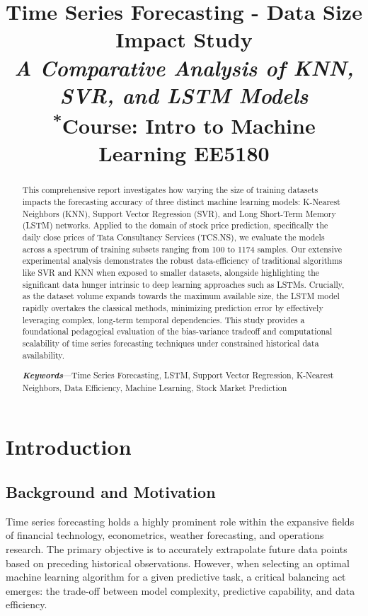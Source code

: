 \documentclass[12pt,onecolumn]{IEEEtran}
\begin{document}
\title{Time Series Forecasting - Data Size Impact Study\\
{\Large \textit{A Comparative Analysis of KNN, SVR, and LSTM Models}}\\
\vspace{1em}
{\normalsize \textsuperscript{*}Course: Intro to Machine Learning EE5180}
}

\author{
}

\maketitle

\vspace{2em}
\begin{abstract}
This comprehensive report investigates how varying the size of training datasets impacts the forecasting accuracy of three distinct machine learning models: K-Nearest Neighbors (KNN), Support Vector Regression (SVR), and Long Short-Term Memory (LSTM) networks. Applied to the domain of stock price prediction, specifically the daily close prices of Tata Consultancy Services (TCS.NS), we evaluate the models across a spectrum of training subsets ranging from 100 to 1174 samples. Our extensive experimental analysis demonstrates the robust data-efficiency of traditional algorithms like SVR and KNN when exposed to smaller datasets, alongside highlighting the significant data hunger intrinsic to deep learning approaches such as LSTMs. Crucially, as the dataset volume expands towards the maximum available size, the LSTM model rapidly overtakes the classical methods, minimizing prediction error by effectively leveraging complex, long-term temporal dependencies. This study provides a foundational pedagogical evaluation of the bias-variance tradeoff and computational scalability of time series forecasting techniques under constrained historical data availability.

\vspace{1em}
\textbf{\textit{Keywords}}---Time Series Forecasting, LSTM, Support Vector Regression, K-Nearest Neighbors, Data Efficiency, Machine Learning, Stock Market Prediction
\end{abstract}

\newpage
\tableofcontents
\newpage

\section{Introduction}
\subsection{Background and Motivation}
Time series forecasting holds a highly prominent role within the expansive fields of financial technology, econometrics, weather forecasting, and operations research. The primary objective is to accurately extrapolate future data points based on preceding historical observations. However, when selecting an optimal machine learning algorithm for a given predictive task, a critical balancing act emerges: the trade-off between model complexity, predictive capability, and data efficiency. 
\end{document}
